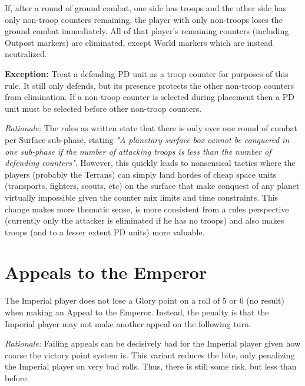 \documentclass[a4paper,11pt]{article}
\begin{document}
If, after a round of ground combat, one side has troops and the other side has only non-troop counters remaining, the player with only non-troops loses the ground combat immediately. All of that player's remaining counters (including Outpost markers) are eliminated, except World markers which are instead neutralized.

\textbf{Exception:} Treat a defending PD unit as a troop counter for purposes of this rule. It still only defends, but its presence protects the other non-troop counters from elimination. If a non-troop counter is selected during placement then a PD unit must be selected before other non-troop counters.

\textit{Rationale:} The rules as written state that there is only ever one round of combat per Surface sub-phase, stating \textit{"A planetary surface box cannot be conquered in one sub-phase if the number of attacking troops is less than the number of defending counters"}. However, this quickly leads to nonsensical tactics where the players (probably the Terrans) can simply land hordes of cheap space units (transports, fighters, scouts, etc) on the surface that make conquest of any planet virtually impossible given the counter mix limits and time constraints. This change makes more thematic sense, is more consistent from a rules perspective (currently only the attacker is eliminated if he has no troops) and also makes troops (and to a lesser extent PD units) more valuable.

\section{Appeals to the Emperor}

The Imperial player does not lose a Glory point on a roll of 5 or 6 (no result) when making an Appeal to the Emperor. Instead, the penalty is that the Imperial player may not make another appeal on the following turn.

\textit{Rationale:} Failing appeals can be decisively bad for the Imperial player given how coarse the victory point system is. This variant reduces the bite, only penalizing the Imperial player on very bad rolls. Thus, there is still some risk, but less than before.
\end{document}
